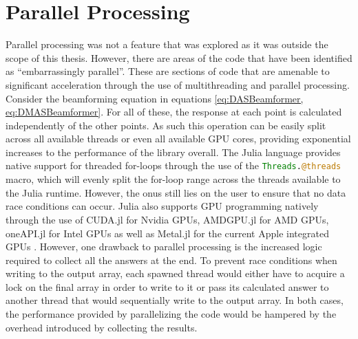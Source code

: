 \section{Parallel Processing}
Parallel processing was not a feature that was explored as it was outside the scope of this thesis. However, there are
areas of the code that have been identified as ``embarrassingly parallel''. These are sections of code that are amenable
to significant acceleration through the use of multithreading and parallel processing. Consider the beamforming equation
in equations \ref{eq:DASBeamformer, eq:DMASBeamformer}. For all of these, the response at each point is calculated
independently of the other points. As such this operation can be easily split across all available threads or even
all available GPU cores, providing exponential increases to the performance of the library overall. The Julia language
provides native support for threaded for-loops through the use of the \lstinline[language=Julia]{Threads.@threads}
macro, which will evenly split the for-loop range across the threads available to the Julia runtime. However, the onus
still lies on the user to ensure that no data race conditions can occur. Julia also supports GPU programming natively
through the use of CUDA.jl for Nvidia GPUs, AMDGPU.jl for AMD GPUs, oneAPI.jl for Intel GPUs as well as Metal.jl for the
current Apple integrated GPUs \cite{JuliaGPU}. However, one drawback to parallel processing is the increased logic
required to collect all the answers at the end. To prevent race conditions when writing to the output array, each
spawned thread would either have to acquire a lock on the final array in order to write to it or pass its calculated
answer to another thread that would sequentially write to the output array. In both cases, the performance provided by
parallelizing the code would be hampered by the overhead introduced by collecting the results. 